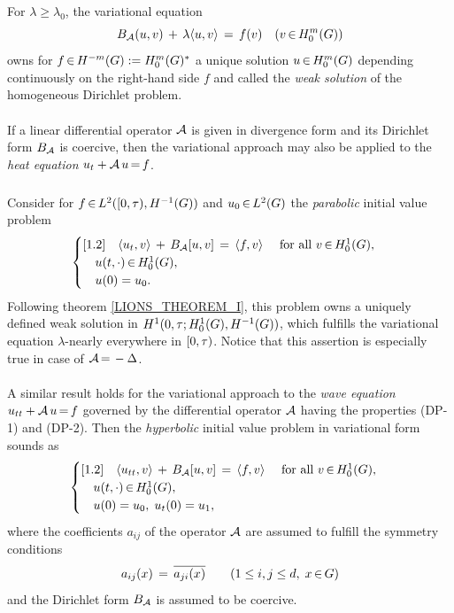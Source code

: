\documentclass[11pt,twoside]{article}
\def\G{G}
\begin{document}
\begin{theorem1}\label{DIRICHLET_EXISTENCE_UNIQUENESS_THEOREM}
For $\lambda \geq \lambda_0$, the variational equation
\[
\DF_{\A}(u,v) \+ \lambda \scalar{u}{v}
\= f(v) \quad (v \xeof \HN{m}{\G})
\]
owns for $f \xeof H^{-m}(\G) := \HN{m}{\G}^*$
a unique solution $u \xeof \HN{m}{\G}$ depending
continuously on the right-hand side $f$ and
called the \textit{weak solution} of the homogeneous Dirichlet problem.
\end{theorem1}

\paragraph{} %
If a linear differential operator ${\mathcal{A}}$ is given in divergence form
and its Dirichlet form $B_{{\mathcal{A}}}$ is coercive,
then the variational approach may also be applied
to the \textit{heat equation} $u_t + {\mathcal{A}} \, u {\,=\,} f$.

\subparagraph{}
Consider for $f \xeof L^2([0,\T), H^{-1}(\G))$ and $u_0 \xeof \Lh$
the \textit{parabolic} initial value problem
\[
\begin{cases}[1.2]
\quad \scalar{u_t}{v} \+ \DF_{\A}[u,v] \= \scalar{f}{v} 
\qfa v \xeof \HN{1}{\G},\\
\quad u(t,\cdot) \xeof \HN{1}{\G}, \\
\quad u(0) = u_0.\\
\end{cases}
\]
Following theorem \ref{LIONS_THEOREM_I},
this problem owns a uniquely defined weak solution
in $H^1(0,\T; \HN{1}{\G}, H^{-1}(\G))$,
which fulfills the variational equation $\lambda$-nearly everywhere in $[0,\tau)$.
Notice that this assertion is especially true in case of ${\mathcal{A}} {\,=\,} -\Delta$.

\paragraph{} %
A similar result holds for the variational approach
to the \textit{wave equation} $u_{tt} + {\mathcal{A}} \, u {\,=\,} f$
governed by the differential operator ${\mathcal{A}}$
having the properties (DP-1) and (DP-2).
Then the \textit{hyperbolic} initial value problem in variational form sounds as
\[
\begin{cases}[1.2]
\quad \scalar{u_{tt}}{v} \+ \DF_{\A}[u,v] \= \scalar{f}{v} 
\qfa v \xeof \HN{1}{\G}, \\
\quad u(t,\cdot) \xeof \HN{1}{\G},\\
\quad u(0)=u_0, \; u_t(0)=u_1, \\
\end{cases}
\]
where the coefficients $a_{ij}$ of the operator ${\mathcal{A}}$ are assumed
to fulfill the symmetry conditions
\[
a_{ij}(x) \= \overline{a_{ji}(x)}
\quad \quad
(1 \leq i,j \leq d, \; x \xeof \G)
\]
and the Dirichlet form $B_{{\mathcal{A}}}$ is assumed to be coercive.
\end{document}
